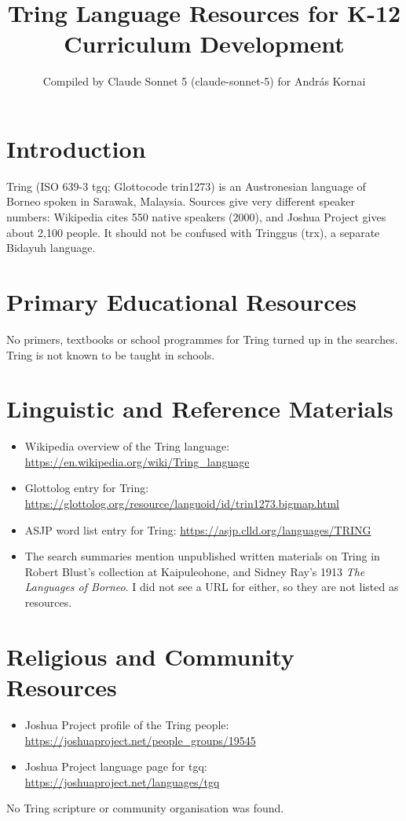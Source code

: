 \documentclass[12pt]{article}
\title{Tring Language Resources for K-12 Curriculum Development}
\author{Compiled by Claude Sonnet 5 (claude-sonnet-5) for Andr\'as Kornai}
\date{}
\begin{document}
\maketitle

\section{Introduction}
Tring (ISO 639-3 tgq; Glottocode trin1273) is an Austronesian language of Borneo spoken in Sarawak, Malaysia. Sources give very different speaker numbers: Wikipedia cites 550 native speakers (2000), and Joshua Project gives about 2,100 people. It should not be confused with Tringgus (trx), a separate Bidayuh language.

\section{Primary Educational Resources}
No primers, textbooks or school programmes for Tring turned up in the searches. Tring is not known to be taught in schools.

\section{Linguistic and Reference Materials}
\begin{itemize}
\item Wikipedia overview of the Tring language: \url{https://en.wikipedia.org/wiki/Tring_language}
\item Glottolog entry for Tring: \url{https://glottolog.org/resource/languoid/id/trin1273.bigmap.html}
\item ASJP word list entry for Tring: \url{https://asjp.clld.org/languages/TRING}
\item The search summaries mention unpublished written materials on Tring in Robert Blust's collection at Kaipuleohone, and Sidney Ray's 1913 \emph{The Languages of Borneo}. I did not see a URL for either, so they are not listed as resources.
\end{itemize}

\section{Religious and Community Resources}
\begin{itemize}
\item Joshua Project profile of the Tring people: \url{https://joshuaproject.net/people_groups/19545}
\item Joshua Project language page for tgq: \url{https://joshuaproject.net/languages/tgq}
\end{itemize}
No Tring scripture or community organisation was found.
\end{document}

